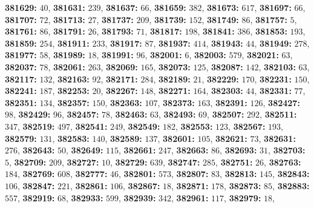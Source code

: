 \textsf{\bfseries 381629:} $40$, \textsf{\bfseries 381631:} $239$, \textsf{\bfseries 381637:} $66$, \textsf{\bfseries 381659:} $382$, \textsf{\bfseries 381673:} $617$, \textsf{\bfseries 381697:} $66$, \textsf{\bfseries 381707:} $72$, \textsf{\bfseries 381713:} $27$, \textsf{\bfseries 381737:} $209$, \textsf{\bfseries 381739:} $152$, \textsf{\bfseries 381749:} $86$, \textsf{\bfseries 381757:} $5$, \textsf{\bfseries 381761:} $86$, \textsf{\bfseries 381791:} $26$, \textsf{\bfseries 381793:} $71$, \textsf{\bfseries 381817:} $198$, \textsf{\bfseries 381841:} $386$, \textsf{\bfseries 381853:} $193$, \textsf{\bfseries 381859:} $254$, \textsf{\bfseries 381911:} $233$, \textsf{\bfseries 381917:} $87$, \textsf{\bfseries 381937:} $414$, \textsf{\bfseries 381943:} $44$, \textsf{\bfseries 381949:} $278$, \textsf{\bfseries 381977:} $58$, \textsf{\bfseries 381989:} $18$, \textsf{\bfseries 381991:} $96$, \textsf{\bfseries 382001:} $6$, \textsf{\bfseries 382003:} $579$, \textsf{\bfseries 382021:} $63$, \textsf{\bfseries 382037:} $78$, \textsf{\bfseries 382061:} $263$, \textsf{\bfseries 382069:} $165$, \textsf{\bfseries 382073:} $125$, \textsf{\bfseries 382087:} $142$, \textsf{\bfseries 382103:} $63$, \textsf{\bfseries 382117:} $132$, \textsf{\bfseries 382163:} $92$, \textsf{\bfseries 382171:} $284$, \textsf{\bfseries 382189:} $21$, \textsf{\bfseries 382229:} $170$, \textsf{\bfseries 382231:} $150$, \textsf{\bfseries 382241:} $187$, \textsf{\bfseries 382253:} $20$, \textsf{\bfseries 382267:} $148$, \textsf{\bfseries 382271:} $164$, \textsf{\bfseries 382303:} $44$, \textsf{\bfseries 382331:} $77$, \textsf{\bfseries 382351:} $134$, \textsf{\bfseries 382357:} $150$, \textsf{\bfseries 382363:} $107$, \textsf{\bfseries 382373:} $163$, \textsf{\bfseries 382391:} $126$, \textsf{\bfseries 382427:} $98$, \textsf{\bfseries 382429:} $96$, \textsf{\bfseries 382457:} $78$, \textsf{\bfseries 382463:} $63$, \textsf{\bfseries 382493:} $69$, \textsf{\bfseries 382507:} $292$, \textsf{\bfseries 382511:} $347$, \textsf{\bfseries 382519:} $497$, \textsf{\bfseries 382541:} $249$, \textsf{\bfseries 382549:} $182$, \textsf{\bfseries 382553:} $123$, \textsf{\bfseries 382567:} $193$, \textsf{\bfseries 382579:} $131$, \textsf{\bfseries 382583:} $140$, \textsf{\bfseries 382589:} $137$, \textsf{\bfseries 382601:} $105$, \textsf{\bfseries 382621:} $73$, \textsf{\bfseries 382631:} $276$, \textsf{\bfseries 382643:} $50$, \textsf{\bfseries 382649:} $115$, \textsf{\bfseries 382661:} $247$, \textsf{\bfseries 382663:} $86$, \textsf{\bfseries 382693:} $31$, \textsf{\bfseries 382703:} $5$, \textsf{\bfseries 382709:} $209$, \textsf{\bfseries 382727:} $10$, \textsf{\bfseries 382729:} $639$, \textsf{\bfseries 382747:} $285$, \textsf{\bfseries 382751:} $26$, \textsf{\bfseries 382763:} $184$, \textsf{\bfseries 382769:} $608$, \textsf{\bfseries 382777:} $46$, \textsf{\bfseries 382801:} $573$, \textsf{\bfseries 382807:} $83$, \textsf{\bfseries 382813:} $145$, \textsf{\bfseries 382843:} $106$, \textsf{\bfseries 382847:} $221$, \textsf{\bfseries 382861:} $106$, \textsf{\bfseries 382867:} $18$, \textsf{\bfseries 382871:} $178$, \textsf{\bfseries 382873:} $85$, \textsf{\bfseries 382883:} $557$, \textsf{\bfseries 382919:} $68$, \textsf{\bfseries 382933:} $599$, \textsf{\bfseries 382939:} $342$, \textsf{\bfseries 382961:} $117$, \textsf{\bfseries 382979:} $18$, 
